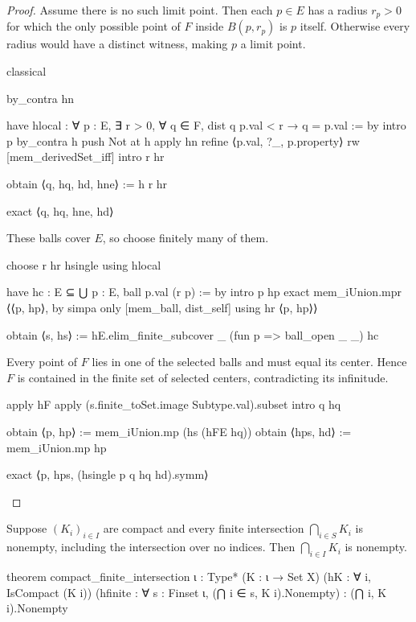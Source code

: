 \begin{proof}
  Assume there is no such limit point.
  Then each $p\in E$ has a radius $r_p>0$ for which the only possible point of $F$ inside
  $B(p,r_p)$ is $p$ itself.
  Otherwise every radius would have a distinct witness, making $p$ a limit point.

  \begin{lean}
    classical

    by_contra hn

    have hlocal : ∀ p : E, ∃ r > 0, ∀ q ∈ F, dist q p.val < r → q = p.val := by
      intro p
      by_contra h
      push Not at h
      apply hn
      refine ⟨p.val, ?_, p.property⟩
      rw [mem_derivedSet_iff]
      intro r hr

      obtain ⟨q, hq, hd, hne⟩ := h r hr

      exact ⟨q, hq, hne, hd⟩
  \end{lean}

  These balls cover $E$, so choose finitely many of them.

  \begin{lean}
    choose r hr hsingle using hlocal

    have hc : E ⊆ ⋃ p : E, ball p.val (r p) := by
      intro p hp
      exact mem_iUnion.mpr ⟨⟨p, hp⟩, by simpa only [mem_ball, dist_self] using hr ⟨p, hp⟩⟩

    obtain ⟨s, hs⟩ := hE.elim_finite_subcover _ (fun p => ball_open _ _) hc
  \end{lean}

  Every point of $F$ lies in one of the selected balls and must equal its center.
  Hence $F$ is contained in the finite set of selected centers, contradicting its infinitude.

  \begin{lean}
    apply hF
    apply (s.finite_toSet.image Subtype.val).subset
    intro q hq

    obtain ⟨p, hp⟩ := mem_iUnion.mp (hs (hFE hq))
    obtain ⟨hps, hd⟩ := mem_iUnion.mp hp

    exact ⟨p, hps, (hsingle p q hq hd).symm⟩
  \end{lean}

\end{proof}

\begin{theorem}
  \label{ma:thm:finite-compact-intersection-property}
  Suppose $(K_i)_{i\in I}$ are compact and every finite intersection $\bigcap_{i\in S}K_i$ is
  nonempty, including the intersection over no indices.
  Then $\bigcap_{i\in I}K_i$ is nonempty.

  \begin{lean}
    theorem compact_finite_intersection {ι : Type*} (K : ι → Set X)
        (hK : ∀ i, IsCompact (K i))
        (hfinite : ∀ s : Finset ι, (⋂ i ∈ s, K i).Nonempty) :
        (⋂ i, K i).Nonempty
  \end{lean}
\end{theorem}

